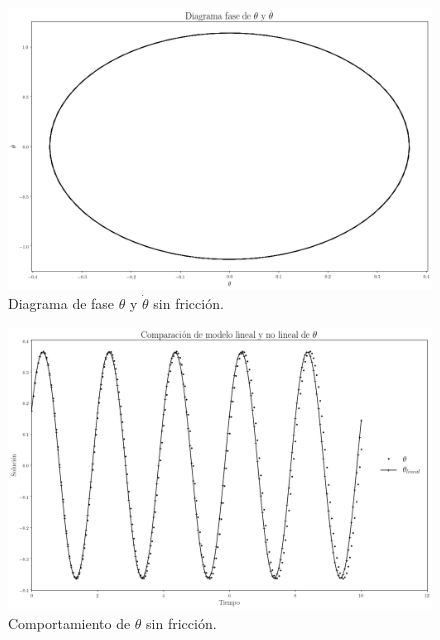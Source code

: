 \documentclass[12pt,letterpaper]{article}
\begin{document}
\begin{figure}[h!]
 \centering
 \includegraphics[scale=0.2]{img/sp_phase_diagram_theta_dtheta.png}
 \caption{Diagrama de fase $\theta$ y $\dot{\theta}$ sin fricción.}
 \label{fig: phase theta dtheta}
\end{figure}

\begin{figure}[h]
 \centering
 \includegraphics[scale=0.2]{img/sp_plot_theta_theta_linear.png}
 \caption{Comportamiento de $\theta$ sin fricción.}
 \label{fig: theta}
\end{figure}
\end{document}

